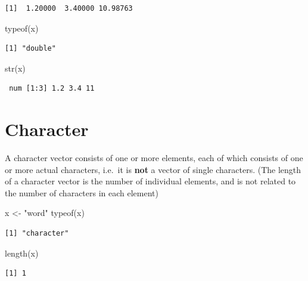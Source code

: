 \documentclass[
]{book}
\newenvironment{Shaded}{\begin{snugshade}}{\end{snugshade}}
\newcommand{\FunctionTok}[1]{\textcolor[rgb]{0.00,0.00,0.00}{#1}}
\newcommand{\NormalTok}[1]{#1}
\newcommand{\OtherTok}[1]{\textcolor[rgb]{0.56,0.35,0.01}{#1}}
\newcommand{\StringTok}[1]{\textcolor[rgb]{0.31,0.60,0.02}{#1}}
\begin{document}
\begin{verbatim}
[1]  1.20000  3.40000 10.98763
\end{verbatim}

\begin{Shaded}
\begin{Highlighting}[]
\FunctionTok{typeof}\NormalTok{(x)}
\end{Highlighting}
\end{Shaded}

\begin{verbatim}
[1] "double"
\end{verbatim}

\begin{Shaded}
\begin{Highlighting}[]
\FunctionTok{str}\NormalTok{(x)}
\end{Highlighting}
\end{Shaded}

\begin{verbatim}
 num [1:3] 1.2 3.4 11
\end{verbatim}

\hypertarget{character}{%
\section{Character}\label{character}}

A character vector consists of one or more elements, each of which consists of one or more actual characters, i.e.~it is \textbf{not} a vector of single characters. (The length of a character vector is the number of individual elements, and is not related to the number of characters in each element)

\begin{Shaded}
\begin{Highlighting}[]
\NormalTok{x }\OtherTok{\textless{}{-}} \StringTok{"word"}
\FunctionTok{typeof}\NormalTok{(x)}
\end{Highlighting}
\end{Shaded}

\begin{verbatim}
[1] "character"
\end{verbatim}

\begin{Shaded}
\begin{Highlighting}[]
\FunctionTok{length}\NormalTok{(x)}
\end{Highlighting}
\end{Shaded}

\begin{verbatim}
[1] 1
\end{verbatim}
\end{document}
